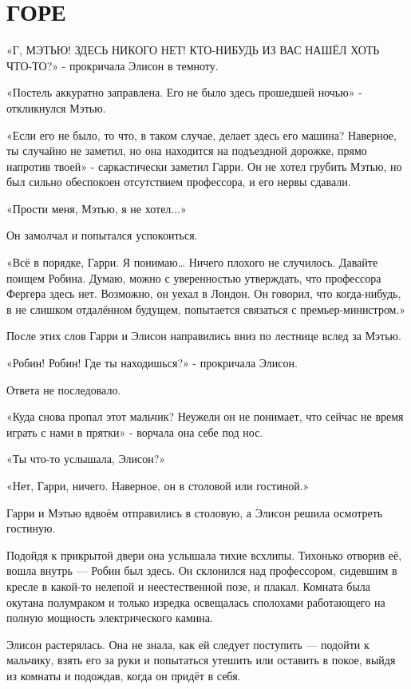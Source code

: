 \documentclass[a4paper,12pt]{book}
\begin{document}
\chapter{ГОРЕ}
\noindent\par«Г{, МЭТЬЮ! ЗДЕСЬ НИКОГО НЕТ!  КТО-НИБУДЬ ИЗ ВАС НАШЁЛ ХОТЬ ЧТО-ТО?}» - прокричала Элисон в темноту.
\par
«Постель аккуратно заправлена. Его не было здесь прошедшей ночью» - откликнулся Мэтью.
\par
«Если его не было, то что, в таком случае, делает здесь его машина? Наверное, ты случайно не заметил, но она находится на подъездной дорожке, прямо напротив твоей» - саркастически заметил Гарри. Он не хотел грубить Мэтью, но был сильно обеспокоен отсутствием профессора, и его нервы сдавали.
\par
«Прости меня, Мэтью, я не хотел...»
\par
Он замолчал и попытался успокоиться.
\par
«Всё в порядке, Гарри. Я понимаю… Ничего плохого не случилось. Давайте поищем Робина. Думаю, можно с уверенностью утверждать, что профессора Фергера здесь нет. Возможно, он уехал в Лондон. Он говорил, что когда-нибудь, в не слишком отдалённом будущем, попытается связаться с премьер-министром.»
\par
После этих слов Гарри и Элисон направились вниз по лестнице вслед за Мэтью.
\par
«Робин! Робин! Где ты находишься?» - прокричала Элисон.
\par
Ответа не последовало.
\par
«Куда снова пропал этот мальчик? Неужели он не понимает, что сейчас не время играть с нами в прятки» - ворчала она себе под нос.
\par
«Ты что-то услышала, Элисон?»
\par
«Нет, Гарри, ничего. Наверное, он в столовой или гостиной.»
\par
Гарри и Мэтью вдвоём отправились в столовую, а Элисон решила осмотреть гостиную.
\par
Подойдя к прикрытой двери она услышала тихие всхлипы. Тихонько отворив её, вошла внутрь — Робин был здесь. Он склонился над профессором, сидевшим в кресле в какой-то нелепой и неестественной позе, и плакал. Комната была окутана полумраком и только изредка освещалась сполохами работающего на полную мощность электрического камина.
\par
Элисон растерялась. Она не знала, как ей следует поступить — подойти к мальчику, взять его за руки и попытаться утешить или оставить в покое, выйдя из комнаты и подождав, когда он придёт в себя.
\end{document}
